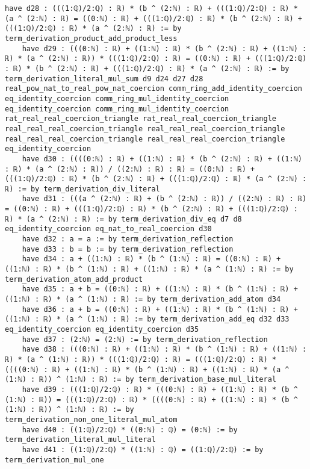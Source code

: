 \documentclass{article}
\begin{document}
\begin{tcolorbox}[colback=white!10, width=\linewidth]
\begin{lstlisting}[language=Lean4]
    have d28 : (((1:ℚ)/2:ℚ) : ℝ) * (b ^ (2:ℕ) : ℝ) + (((1:ℚ)/2:ℚ) : ℝ) * (a ^ (2:ℕ) : ℝ) = ((0:ℕ) : ℝ) + (((1:ℚ)/2:ℚ) : ℝ) * (b ^ (2:ℕ) : ℝ) + (((1:ℚ)/2:ℚ) : ℝ) * (a ^ (2:ℕ) : ℝ) := by term_derivation_product_add_product_less
    have d29 : (((0:ℕ) : ℝ) + ((1:ℕ) : ℝ) * (b ^ (2:ℕ) : ℝ) + ((1:ℕ) : ℝ) * (a ^ (2:ℕ) : ℝ)) * (((1:ℚ)/2:ℚ) : ℝ) = ((0:ℕ) : ℝ) + (((1:ℚ)/2:ℚ) : ℝ) * (b ^ (2:ℕ) : ℝ) + (((1:ℚ)/2:ℚ) : ℝ) * (a ^ (2:ℕ) : ℝ) := by term_derivation_literal_mul_sum d9 d24 d27 d28 real_pow_nat_to_real_pow_nat_coercion comm_ring_add_identity_coercion eq_identity_coercion comm_ring_mul_identity_coercion eq_identity_coercion comm_ring_mul_identity_coercion rat_real_real_coercion_triangle rat_real_real_coercion_triangle real_real_real_coercion_triangle real_real_real_coercion_triangle real_real_real_coercion_triangle real_real_real_coercion_triangle eq_identity_coercion
    have d30 : ((((0:ℕ) : ℝ) + ((1:ℕ) : ℝ) * (b ^ (2:ℕ) : ℝ) + ((1:ℕ) : ℝ) * (a ^ (2:ℕ) : ℝ)) / ((2:ℕ) : ℝ) : ℝ) = ((0:ℕ) : ℝ) + (((1:ℚ)/2:ℚ) : ℝ) * (b ^ (2:ℕ) : ℝ) + (((1:ℚ)/2:ℚ) : ℝ) * (a ^ (2:ℕ) : ℝ) := by term_derivation_div_literal
    have d31 : (((a ^ (2:ℕ) : ℝ) + (b ^ (2:ℕ) : ℝ)) / ((2:ℕ) : ℝ) : ℝ) = ((0:ℕ) : ℝ) + (((1:ℚ)/2:ℚ) : ℝ) * (b ^ (2:ℕ) : ℝ) + (((1:ℚ)/2:ℚ) : ℝ) * (a ^ (2:ℕ) : ℝ) := by term_derivation_div_eq d7 d8 eq_identity_coercion eq_nat_to_real_coercion d30
    have d32 : a = a := by term_derivation_reflection
    have d33 : b = b := by term_derivation_reflection
    have d34 : a + ((1:ℕ) : ℝ) * (b ^ (1:ℕ) : ℝ) = ((0:ℕ) : ℝ) + ((1:ℕ) : ℝ) * (b ^ (1:ℕ) : ℝ) + ((1:ℕ) : ℝ) * (a ^ (1:ℕ) : ℝ) := by term_derivation_atom_add_product
    have d35 : a + b = ((0:ℕ) : ℝ) + ((1:ℕ) : ℝ) * (b ^ (1:ℕ) : ℝ) + ((1:ℕ) : ℝ) * (a ^ (1:ℕ) : ℝ) := by term_derivation_add_atom d34
    have d36 : a + b = ((0:ℕ) : ℝ) + ((1:ℕ) : ℝ) * (b ^ (1:ℕ) : ℝ) + ((1:ℕ) : ℝ) * (a ^ (1:ℕ) : ℝ) := by term_derivation_add_eq d32 d33 eq_identity_coercion eq_identity_coercion d35
    have d37 : (2:ℕ) = (2:ℕ) := by term_derivation_reflection
    have d38 : (((0:ℕ) : ℝ) + ((1:ℕ) : ℝ) * (b ^ (1:ℕ) : ℝ) + ((1:ℕ) : ℝ) * (a ^ (1:ℕ) : ℝ)) * (((1:ℚ)/2:ℚ) : ℝ) = (((1:ℚ)/2:ℚ) : ℝ) * ((((0:ℕ) : ℝ) + ((1:ℕ) : ℝ) * (b ^ (1:ℕ) : ℝ) + ((1:ℕ) : ℝ) * (a ^ (1:ℕ) : ℝ)) ^ (1:ℕ) : ℝ) := by term_derivation_base_mul_literal
    have d39 : (((1:ℚ)/2:ℚ) : ℝ) * (((0:ℕ) : ℝ) + ((1:ℕ) : ℝ) * (b ^ (1:ℕ) : ℝ)) = (((1:ℚ)/2:ℚ) : ℝ) * ((((0:ℕ) : ℝ) + ((1:ℕ) : ℝ) * (b ^ (1:ℕ) : ℝ)) ^ (1:ℕ) : ℝ) := by term_derivation_non_one_literal_mul_atom
    have d40 : ((1:ℚ)/2:ℚ) * ((0:ℕ) : ℚ) = (0:ℕ) := by term_derivation_literal_mul_literal
    have d41 : ((1:ℚ)/2:ℚ) * ((1:ℕ) : ℚ) = ((1:ℚ)/2:ℚ) := by term_derivation_mul_one

\end{lstlisting}
\end{tcolorbox}
\end{document}
